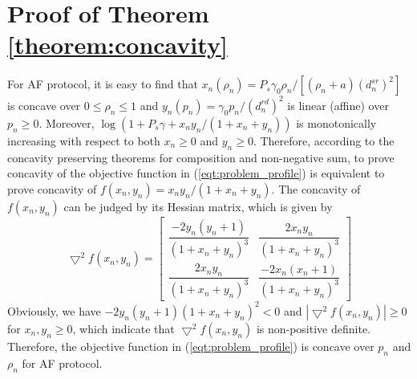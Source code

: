 \documentclass[12pt, draftclsnofoot, onecolumn]{IEEEtran}
\begin{document}
 







%


\appendices
\section{Proof of Theorem \ref{theorem:concavity}}\label{app:a}
For AF protocol, it is easy to find that $x_{n}(\rho_{n})=P_{s}\gamma_{0}\rho_{n}/[(\rho_{n} +a)(d^{sr}_{n})^{2}]$ is concave over $0\leq\rho_{n}\leq 1$ and $y_{n}(p_{n})=\gamma_{0}p_{n}/(d^{rd}_{n})^{2}$ is linear (affine) over $p_{n}\geq 0$. Moreover, $\log(1+P_{s}\gamma+x_{n}y_{n}/(1+x_{n}+y_{n}))$ is monotonically increasing with respect to both $x_{n}\geq 0$ and $y_{n}\geq 0$. Therefore, according to the concavity preserving theorems for composition and non-negative sum\cite{Boyd:2004:CO:993483}, to prove concavity of the objective function in (\ref{eqt:problem_profile}) is equivalent to prove concavity of $f(x_{n},y_{n})=x_{n}y_{n}/(1+x_{n}+y_{n})$. The concavity of $f(x_{n},y_{n})$ can be judged by its Hessian matrix, which is given by
\begin{equation}
\bigtriangledown ^{2}f(x_{n},y_{n})=
\left[
\begin{array}{cc}
\dfrac{-2y_{n}(y_{n}+1)}{(1+x_{n}+y_{n})^{3}} & \dfrac{2x_{n}y_{n}}{(1+x_{n}+y_{n})^{3}}\\ 
\dfrac{2x_{n}y_{n}}{(1+x_{n}+y_{n})^{3}} & \dfrac{-2x_{n}(x_{n}+1)}{(1+x_{n}+y_{n})^{3}}
\end{array}
\right]
\end{equation}
Obviously, we have $-2y_{n}(y_{n}+1){(1+x_{n}+y_{n})^{2}}<0$ and $|\bigtriangledown ^{2}f(x_{n},y_{n})|\geq 0$ for $x_{n}, y_{n}\geq 0$, which indicate that $\bigtriangledown ^{2}f(x_{n},y_{n})$ is non-positive definite. Therefore, the objective function in (\ref{eqt:problem_profile}) is concave over $p_{n}$ and $\rho_{n}$ for AF protocol. 
\end{document}
